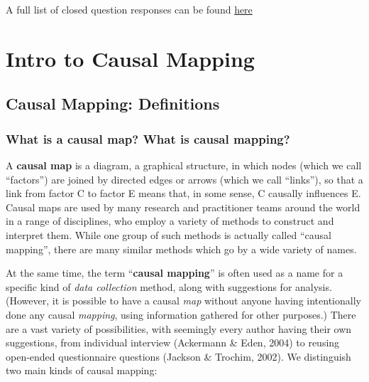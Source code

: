 \documentclass[
]{book}
\begin{document}
A full list of closed question responses can be found \href{https://drive.google.com/drive/folders/1wvifDQ0BXmAjSudTRUv9i_4JURpphD4v}{here}

\hypertarget{part-intro-to-causal-mapping}{%
\part{Intro to Causal Mapping}\label{part-intro-to-causal-mapping}}

\hypertarget{causal-mapping-definitions}{%
\chapter{Causal Mapping: Definitions}\label{causal-mapping-definitions}}

\hypertarget{what-is-a-causal-map-what-is-causal-mapping}{%
\section{What is a causal map? What is causal mapping?}\label{what-is-a-causal-map-what-is-causal-mapping}}

A \textbf{causal map} is a diagram, a graphical structure, in which nodes (which we call ``factors'') are joined by directed edges or arrows (which we call ``links''), so that a link from factor C to factor E means that, in some sense, C causally influences E. Causal maps are used by many research and practitioner teams around the world in a range of disciplines, who employ a variety of methods to construct and interpret them. While one group of such methods is actually called ``causal mapping'', there are many similar methods which go by a wide variety of names.

At the same time, the term ``\textbf{causal mapping}'' is often used as a name for a specific kind of \emph{data collection} method, along with suggestions for analysis. (However, it is possible to have a causal \emph{map} without anyone having intentionally done any causal \emph{mapping}, using information gathered for other purposes.) There are a vast variety of possibilities, with seemingly every author having their own suggestions, from individual interview (Ackermann \& Eden, 2004) to reusing open-ended questionnaire questions (Jackson \& Trochim, 2002). We distinguish two main kinds of causal mapping:
\end{document}

